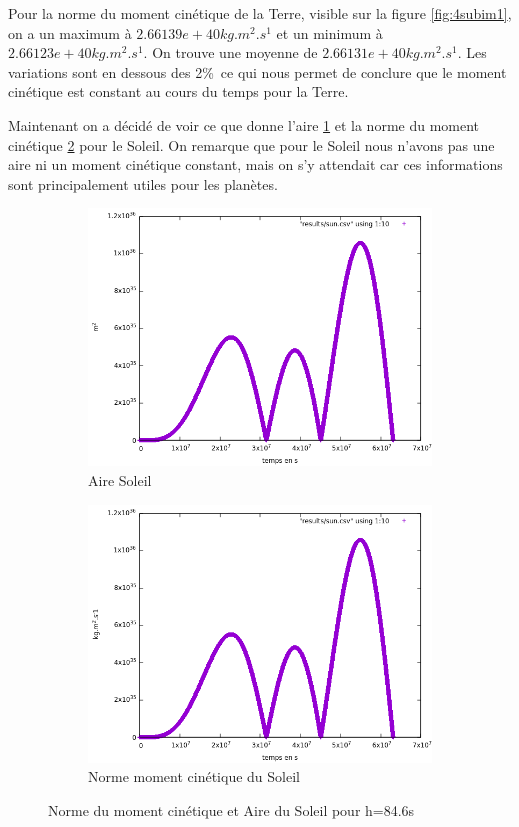 \documentclass[11pt]{article}
\begin{document}
Pour la norme du moment cinétique de la Terre, visible sur la figure \ref{fig:4subim1}, on a un maximum à \(2.66139e+40 kg.m^2.s^1\) et un minimum à \(2.66123e+40 kg.m^2.s^1\). On trouve une moyenne de \(2.66131 e+40 kg.m^2.s^1\). Les variations sont en dessous des 2\%\ ce qui nous permet de conclure que le moment cinétique est constant au cours du temps pour la Terre.

Maintenant on a décidé de voir ce que donne l'aire \ref{fig:5subim1} et la norme du moment cinétique \ref{fig:5subim2} pour le Soleil. On remarque que pour le Soleil nous n'avons pas une aire ni un moment cinétique constant, mais on s'y attendait car ces informations sont principalement utiles pour les planètes.
\begin{figure}[H]
\begin{subfigure}{0.5\textwidth}
\includegraphics[width=1\linewidth]{modelisations/h=60s/aire-sun.png}
\caption{Aire Soleil}
\label{fig:5subim1}
\end{subfigure}
\begin{subfigure}{0.5\textwidth}
\includegraphics[width=1\linewidth]{modelisations/h=60s/mmc_sun.png}
\caption{Norme moment cinétique du Soleil}
\label{fig:5subim2}
\end{subfigure}
\caption{Norme du moment cinétique et Aire du Soleil pour h=84.6s}
\label{fig:image2}
\end{figure}
\end{document}
